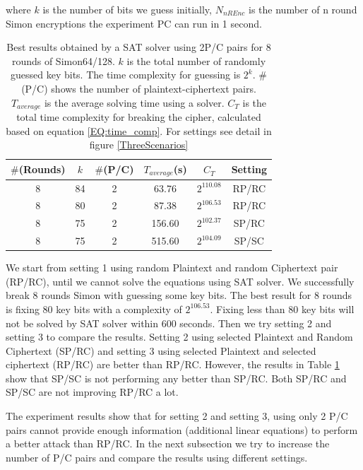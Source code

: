 where $k$ is the number of bits we guess initially, $N_{nREnc}$ is the number of n round Simon encryptions the experiment PC can run in 1 second.

\begin{table}[!hh]
	\caption[Best results obtained by a SAT solver using 2P/C pairs]{Best results obtained by a SAT solver using 2P/C pairs for 8 rounds of Simon64/128. $k$ is the total number of randomly guessed key bits. The time complexity for guessing is $2^{k}$. $\#$(P/C) shows the number of plaintext-ciphertext pairs. $T_{average}$ is the average solving time using a solver. $C_T$  is the total time complexity for breaking the cipher, calculated based on equation \ref{EQ:time_comp}. For settings see detail in figure \ref{ThreeScenarios}}\label{tab:example1} \centering
	\begin{tabular}{|c|c|c|c|c|c|}
		\hline
		$\#$(Rounds) & $k$ & $\#$(P/C) & $T_{average}$(s) & $C_T$ & Setting \\
		\hline
		8 & 84 & 2 & 63.76   & $2^{110.08}$ & RP/RC \\
		8 & 80 & 2 & 87.38   & $2^{106.53}$ & RP/RC \\
		\hline
		8 & 75 & 2 & 156.60  & $2^{102.37}$ & SP/RC \\
		\hline
		8 & 75 & 2 & 515.60  & $2^{104.09}$ & SP/SC \\
		\hline
	\end{tabular}
\end{table}

We start from setting 1 using random Plaintext and random Ciphertext pair (RP/RC), until we cannot solve the equations using SAT solver. We successfully break 8 rounds Simon with guessing some key bits. The best result for 8 rounds is fixing 80 key bits with a complexity of $2^{106.53}$. Fixing less than 80 key bits will not be solved by SAT solver within 600 seconds. Then we try setting 2 and setting 3 to compare the results. Setting 2 using selected Plaintext and Random Ciphertext (SP/RC) and setting 3 using selected Plaintext and selected ciphertext (RP/RC) are better than RP/RC. However, the results in Table \ref{tab:example1} show that SP/SC is not performing any better than SP/RC. Both SP/RC and SP/SC are not improving RP/RC a lot. 

The experiment results show that for setting 2 and setting 3, using only 2 P/C pairs cannot provide enough information (additional linear equations) to perform a better attack than RP/RC. In the next subsection we try to increase the number of P/C pairs and compare the results using different settings.

